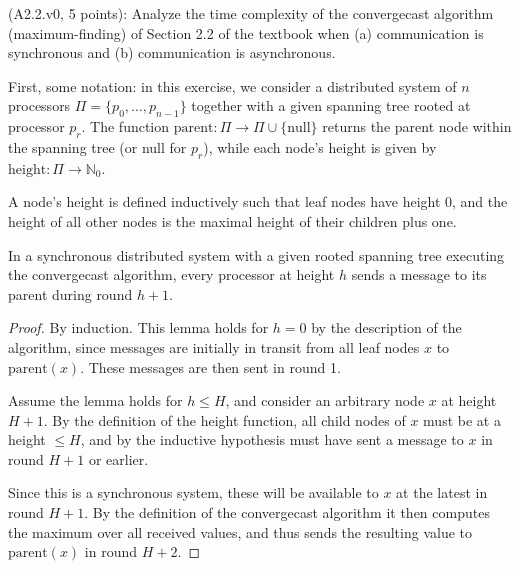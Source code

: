 \begin{Exc}{(A2.2.v0, 5 points):} \label{exc:1}
Analyze the time complexity of the convergecast algorithm
(maximum-finding) of Section 2.2 of the textbook when (a) communication is
synchronous and (b) communication is asynchronous.
\end{Exc}

\begin{comment}
Hint: For the synchronous case, prove that during round t + 1, a processor at
height t sends a message to its parent. For the asynchronous case, prove that
by time t, a processor at height t has sent a message to its parent.
\end{comment}

\newcommand{\prnt}[1]{\text{parent}(#1)}
\newcommand{\hght}[1]{\text{height}(#1)}

First, some notation: in this exercise, we consider a distributed system of $n$
processors $\Pi=\{p_0,\dots,p_{n-1}\}$ together with a given spanning tree
rooted at processor $p_r$. The function
$\text{parent}: \Pi \rightarrow \Pi \cup \{ \text{null} \}$ returns the parent node
within the spanning tree (or null for $p_r$), while each node's height is given by
$\text{height}: \Pi \rightarrow \mathbb{N}_0$.

\begin{definition}
A node's height is defined inductively such that leaf nodes have height 0,
and the height of all other nodes is the maximal height of their children plus one.
\end{definition}


\begin{lemma} \label{lemma:1sync}
In a synchronous distributed system with a given rooted spanning tree executing the convergecast
algorithm, every processor at height $h$ sends a message to its parent during round $h + 1$.
\end{lemma}

\begin{proof}
By induction. This lemma holds for $h = 0$ by the description of the algorithm, since
messages are initially in transit from all leaf nodes $x$ to $\prnt{x}$. These messages
are then sent in round 1.

Assume the lemma holds for $h \leq H$, and consider an arbitrary node $x$ at height
$H + 1$. By the definition of the height function, all child nodes of $x$ must be at
a height $\leq H$, and by the inductive hypothesis must have sent a message to
$x$ in round $H + 1$ or earlier.

Since this is a synchronous system, these will be available
to $x$ at the latest in round $H + 1$. By the definition of the
convergecast algorithm it then computes the maximum over all received values, and
thus sends the resulting value to $\prnt{x}$ in round $H + 2$.
\end{proof}

